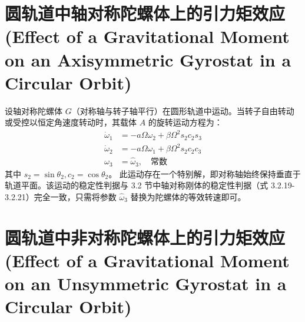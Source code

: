 \section{圆轨道中轴对称陀螺体上的引力矩效应 (Effect of a Gravitational Moment on an Axisymmetric Gyrostat in a Circular Orbit)}

设轴对称陀螺体 \(G\)（对称轴与转子轴平行）在圆形轨道中运动。当转子自由转动或受控以恒定角速度转动时，其载体 \(A\) 的旋转运动方程为：
\begin{align}
\dot{\omega}_1 &= -a\Omega\omega_2 + \beta\Omega^2 s_2 c_2 s_3 \tag{7} \\
\dot{\omega}_2 &= -a\Omega\omega_1 + \beta\Omega^2 s_2 c_2 c_3 \tag{8} \\
\omega_3 &= \hat{\omega}_3, \quad \text{常数} \tag{9}
\end{align}
其中 \(s_2 = \sin\theta_2, c_2 = \cos\theta_2\)。
此运动存在一个特别解，即对称轴始终保持垂直于轨道平面。该运动的稳定性判据与 3.2 节中轴对称刚体的稳定性判据（式 3.2.19-3.2.21）完全一致，只需将参数 \(\hat{\omega}_3\) 替换为陀螺体的等效转速即可。

\section{圆轨道中非对称陀螺体上的引力矩效应 (Effect of a Gravitational Moment on an Unsymmetric Gyrostat in a Circular Orbit)}

